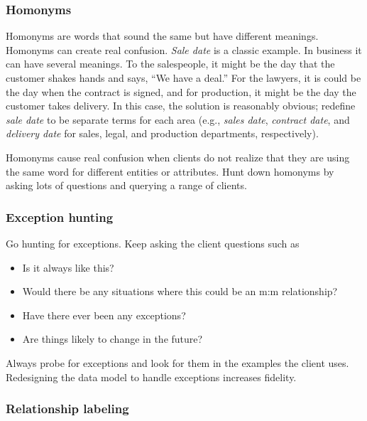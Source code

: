 \documentclass[
]{article}
\begin{document}
\hypertarget{homonyms}{%
\subsubsection*{Homonyms}\label{homonyms}}

Homonyms are words that sound the same but have different meanings.
Homonyms can create real confusion. \emph{Sale date} is a classic example. In
business it can have several meanings. To the salespeople, it might be
the day that the customer shakes hands and says, ``We have a deal.'' For
the lawyers, it is could be the day when the contract is signed, and for
production, it might be the day the customer takes delivery. In this
case, the solution is reasonably obvious; redefine \emph{sale date} to be
separate terms for each area (e.g., \emph{sales date}, \emph{contract date}, and
\emph{delivery date} for sales, legal, and production departments,
respectively).

Homonyms cause real confusion when clients do not realize that they are
using the same word for different entities or attributes. Hunt down
homonyms by asking lots of questions and querying a range of clients.

\hypertarget{exception-hunting}{%
\subsubsection*{Exception hunting}\label{exception-hunting}}

Go hunting for exceptions. Keep asking the client questions such as

\begin{itemize}
\item
  Is it always like this?
\item
  Would there be any situations where this could be an m:m
  relationship?
\item
  Have there ever been any exceptions?
\item
  Are things likely to change in the future?
\end{itemize}

Always probe for exceptions and look for them in the examples the client
uses. Redesigning the data model to handle exceptions increases
fidelity.

\hypertarget{relationship-labeling}{%
\subsubsection*{Relationship labeling}\label{relationship-labeling}}
\end{document}
